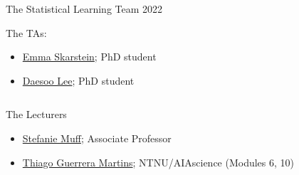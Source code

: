 \documentclass[10pt,ignorenonframetext,]{beamer}
\providecommand{\tightlist}{%
  \setlength{\itemsep}{0pt}\setlength{\parskip}{0pt}}
\begin{document}
\begin{frame}{The Statistical Learning Team 2022}
\protect\hypertarget{the-statistical-learning-team-2022}{}

\begin{block}{The TAs:}

\vspace{2mm}

\begin{itemize}
\tightlist
\item
  \href{https://www.ntnu.no/ansatte/emma.s.skarstein}{Emma Skarstein};
  PhD student
\item
  \href{https://www.ntnu.no/ansatte/daesoo.lee}{Daesoo Lee}; PhD student
\end{itemize}

\(~\)

\end{block}

\begin{block}{The Lecturers}

\vspace{2mm}

\begin{itemize}
\tightlist
\item
  \href{https://www.ntnu.edu/employees/stefanie.muff}{Stefanie Muff};
  Associate Professor
\item
  \href{https://www.ntnu.no/ansatte/thiago.guerrera}{Thiago Guerrera
  Martins}; NTNU/AIAscience (Modules 6, 10)
\end{itemize}

\end{block}

\end{frame}
\end{document}
